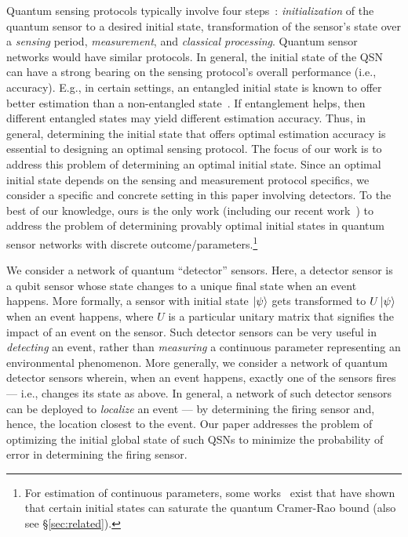 Quantum sensing protocols typically involve four steps~\cite{RevModPhys.quantumsensing}: {\em initialization} of the quantum sensor to a desired initial state, transformation of the sensor's state over a {\em sensing} period, {\em measurement}, and {\em classical processing}.
Quantum sensor networks would have similar protocols.
In general, the initial state of the QSN can have a strong bearing on the
sensing protocol's overall performance (i.e., accuracy). E.g., in certain
settings, an entangled initial state is known to offer better estimation than
a non-entangled state~\cite{mpe_2018,Eldredge_2018}. 
If entanglement helps, then different 
entangled states may yield different estimation accuracy.
Thus, in general, determining the initial state that offers optimal estimation 
accuracy is essential to designing an optimal sensing protocol.
The focus of our work is to address this problem of determining an optimal initial 
state. Since an optimal initial state depends on the sensing and 
measurement protocol specifics, we consider a specific and concrete 
setting in this paper involving detectors.  
To the best of our knowledge, 
ours is the only work (including our recent work~\cite{Hillery_2023}) to 
address the problem of determining provably optimal initial states in quantum sensor 
networks with discrete outcome/parameters.\footnote{For estimation of continuous parameters, 
some works~\cite{Eldredge_2018,saleem_dickestate} exist that have shown that 
certain initial states can saturate the quantum Cramer-Rao bound (also see \S\ref{sec:related}).}


We consider a network of quantum ``detector'' sensors. Here,
a detector sensor is a qubit sensor whose state changes to a unique final state when an event happens. 
More formally, a sensor with initial state $\ket{\psi}$ gets transformed to $U\ket{\psi}$ when an event happens, where $U$ is a particular unitary matrix that signifies the impact of an event on the sensor.  Such detector sensors can be very useful in {\em detecting} an event, rather than {\em measuring} a continuous parameter representing an environmental phenomenon. 
More generally, we 
consider a network of quantum detector sensors wherein, when an event happens, exactly one of the sensors fires--- i.e., changes its state as above.
In general, a network of such detector sensors can be deployed to {\em localize} an event --- by determining the firing sensor and, hence, the location closest to the event.
Our paper addresses the problem of optimizing the initial global state of such QSNs
to minimize the probability of error in determining the firing sensor.

